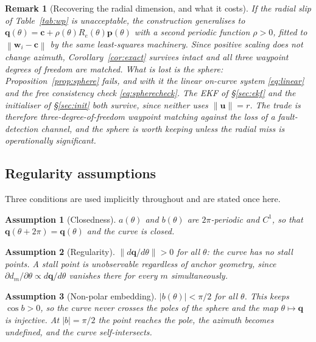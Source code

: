\documentclass[11pt,a4paper]{article}
\newtheorem{assumption}{Assumption}
\newtheorem{remark}{Remark}
\newcommand{\q}{\bm{q}}
\newcommand{\pv}{\bm{p}}
\newcommand{\uv}{\bm{u}}
\newcommand{\cv}{\bm{c}}
\newcommand{\Rot}{R}
\newcommand{\norm}[1]{\left\lVert#1\right\rVert}
\begin{document}
\begin{remark}[Recovering the radial dimension, and what it costs]
\label{rem:varradius}
If the radial slip of Table~\ref{tab:wp} is unacceptable, the construction
generalises to $\q(\theta) = \cv + \rho(\theta)\Rot_e(\theta)\pv(\theta)$ with a
second periodic function $\rho>0$, fitted to $\norm{\bm w_i-\cv}$ by the same
least-squares machinery. Since positive scaling does not change azimuth,
Corollary~\ref{cor:exact} survives intact and all three waypoint degrees of
freedom are matched. What is lost is the sphere: Proposition~\ref{prop:sphere}
fails, and with it the linear on-curve system \eqref{eq:linear} and the free
consistency check \eqref{eq:spherecheck}. The EKF of \S\ref{sec:ekf} and the
initialiser of \S\ref{sec:init} both survive, since neither uses
$\norm{\uv}=r$. The trade is therefore three-degree-of-freedom waypoint
matching against the loss of a fault-detection channel, and the sphere is worth
keeping unless the radial miss is operationally significant.
\end{remark}


\subsection{Regularity assumptions}

Three conditions are used implicitly throughout and are stated once here.

\begin{assumption}[Closedness]
\label{as:closed}
$a(\theta)$ and $b(\theta)$ are $2\pi$-periodic and $C^1$, so that
$\q(\theta+2\pi)=\q(\theta)$ and the curve is closed.
\end{assumption}

\begin{assumption}[Regularity]
\label{as:regular}
$\norm{d\q/d\theta} > 0$ for all $\theta$: the curve has no stall points. A
stall point is unobservable regardless of anchor geometry, since
$\partial d_m/\partial\theta \propto d\q/d\theta$ vanishes there for
\emph{every} $m$ simultaneously.
\end{assumption}

\begin{assumption}[Non-polar embedding]
\label{as:polar}
$|b(\theta)| < \pi/2$ for all $\theta$. This keeps $\cos b > 0$, so the curve
never crosses the poles of the sphere and the map $\theta\mapsto\q$ is injective.
At $|b|=\pi/2$ the point reaches the pole, the azimuth becomes undefined, and
the curve self-intersects.
\end{assumption}
\end{document}
